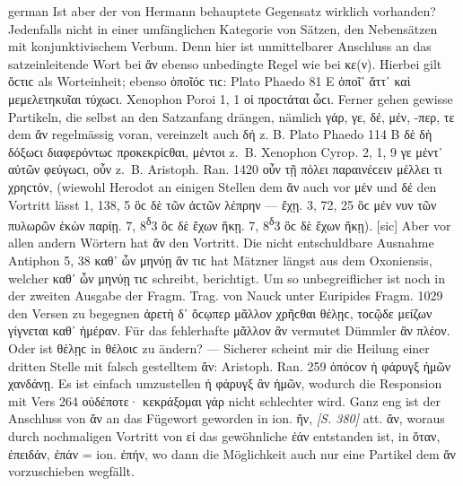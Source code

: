 \begin{otherlanguage*}{german}
Ist aber der von Hermann behauptete Gegensatz wirklich vorhanden? Jedenfalls nicht in einer umfänglichen Kategorie von Sätzen, den Nebensätzen mit konjunktivischem Verbum. Denn hier ist unmittelbarer Anschluss an das satzeinleitende Wort bei ἄν ebenso unbedingte Regel wie bei κε(ν). Hierbei gilt ὅϲτιϲ als Worteinheit; ebenso ὁποῖόϲ τιϲ: Plato Phaedo 81 Ε ὁποῖ᾽ ἄττ᾽  καὶ μεμελετηκυῖαι τύχωϲι. Xenophon Poroi 1, 1  οἱ προϲτάται ὦϲι. Ferner gehen gewisse Partikeln, die selbst an den Satzanfang drängen, nämlich γάρ, γε, δέ, μέν, -περ, τε dem ἄν regelmässig voran, vereinzelt auch δή z. B. Plato Phaedo 114 B  δὲ δὴ  δόξωϲι διαφερόντωϲ προκεκρίϲθαι, μέντοι z.~Β. Xenophon Cyrop. 2, 1, 9  γε μέντ᾽  αὐτῶν φεύγωϲι, οὖν z.~Β. Aristoph. Ran. 1420  οὖν  τῇ πόλει παραινέϲειν μέλλει τι χρηϲτόν, (wiewohl Herodot an einigen Stellen dem ἄν auch vor μέν und δέ den Vortritt lässt 1, 138, 5 ὃϲ  δὲ τῶν ἀϲτῶν λέπρην — ἔχῃ. 3, 72, 25 ὃϲ  μέν νυν τῶν πυλωρῶν ἑκὼν παρίῃ. 7, 8\textsuperscript{δ}3 ὃϲ  δὲ ἔχων ἥκῃ. 7, 8\textsuperscript{δ}3 ὃϲ  δὲ ἔχων ἥκῃ). [sic] Aber vor allen andern Wörtern hat ἄν den Vortritt. Die nicht entschuldbare Ausnahme Antiphon 5, 38 καθ᾽ ὧν μηνύῃ ἄν τιϲ hat Mätzner längst aus dem Oxoniensis, welcher καθ᾽ ὧν  μηνύῃ τιϲ schreibt, berichtigt. Um so unbegreiflicher ist noch in der zweiten Ausgabe der Fragm. Trag. von Nauck unter Euripides Fragm. 1029 den Versen zu begegnen ἀρετὴ δ᾽ ὅϲῳπερ μᾶλλον  χρῆϲθαι θέλῃϲ, τοϲῷδε μείζων γίγνεται καθ᾽ ἡμέραν. Für das fehlerhafte μᾶλλον ἂν vermutet Dümmler ἂν πλέον. Oder ist θέλῃϲ in θέλοιϲ zu ändern? — Sicherer scheint mir die Heilung einer dritten Stelle mit falsch gestelltem ἄν: Aristoph. Ran. 259 ὁπόϲον ἡ φάρυγξ  ἡμῶν χανδάνῃ. Es ist einfach umzustellen ἡ φάρυγξ  ἂν ἡμῶν, wodurch die Responsion mit Vers 264 οὐδέποτε· κεκράξομαι γάρ nicht schlechter wird. Ganz eng ist der Anschluss von ἄν an das Fügewort geworden in ion. ἤν, \hypertarget{p380}{\emph{[S. 380]}}\label{p380} att. ἄν, woraus durch nochmaligen Vortritt von εἰ das gewöhnliche ἐάν entstanden ist, in ὅταν, ἐπειδάν, ἐπάν = ion. ἐπήν, wo dann die Möglichkeit auch nur eine Partikel dem ἄν vorzuschieben wegfällt.


\end{otherlanguage*}
